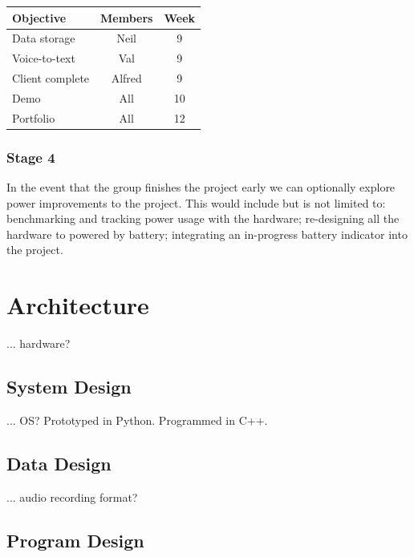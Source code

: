 \documentclass[11pt,a4paper,titlepage]{report}
\begin{document}
\begin{center}
\begin{table}[H]
\begin{tabular}{|l|c|c|}
    \hline
    \textbf{Objective} & \textbf{Members} & \textbf{Week} \\ \hline

    Data storage & Neil & 9 \\ \hline    
    Voice-to-text & Val & 9 \\ \hline    
    Client complete & Alfred & 9 \\ \hline    
    Demo & All & 10 \\ \hline    
    Portfolio & All & 12 \\ \hline    

\end{tabular}
\end{table}
\end{center}

\subsubsection{Stage 4}

In the event that the group finishes the project early we can optionally explore power improvements to the project. This would include but is not limited to: benchmarking and tracking power usage with the hardware; re-designing all the hardware to powered by battery; integrating an in-progress battery indicator into the project.



\section{Architecture}

{\color{red}... hardware?}

\subsection{System Design}

{\color{red}... OS? Prototyped in Python. Programmed in C++.}

\subsection{Data Design}

{\color{red}... audio recording format?}

\subsection{Program Design}
\end{document}
